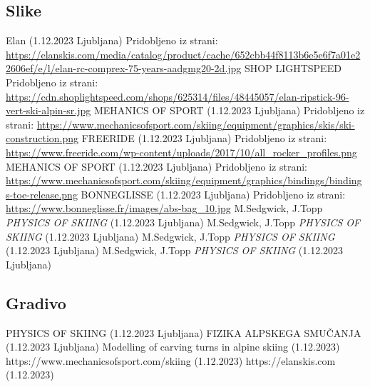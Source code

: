 \documentclass{article}
\begin{document}
\subsection{Slike}

\begin{thebibliography}{20}
      Elan (1.12.2023 Ljubljana) Pridobljeno iz strani: \url{https://elanskis.com/media/catalog/product/cache/652cbb44f8113b6e5e6f7a01e22606ef/e/l/elan-rc-comprex-75-years-aadgmg20-2d.jpg}
     SHOP LIGHTSPEED Pridobljeno iz strani: \url{https://cdn.shoplightspeed.com/shops/625314/files/48445057/elan-ripstick-96-vert-ski-alpin-sr.jpg}
     MEHANICS OF SPORT (1.12.2023 Ljubljana) Pridobljeno iz strani: \url{https://www.mechanicsofsport.com/skiing/equipment/graphics/skis/ski-construction.png}
     FREERIDE (1.12.2023 Ljubljana) Pridobljeno iz strani: \url{https://www.freeride.com/wp-content/uploads/2017/10/all_rocker_profiles.png} 
     MEHANICS OF SPORT (1.12.2023 Ljubljana) Pridobljeno iz strani: \url{https://www.mechanicsofsport.com/skiing/equipment/graphics/bindings/bindings-toe-release.png}
     BONNEGLISSE (1.12.2023 Ljubljana) Pridobljeno iz strani: \url{https://www.bonneglisse.fr/images/abs-bag_10.jpg}
     M.Sedgwick, J.Topp \emph{PHYSICS OF SKIING} (1.12.2023 Ljubljana)
     M.Sedgwick, J.Topp \emph{PHYSICS OF SKIING} (1.12.2023 Ljubljana)
     M.Sedgwick, J.Topp \emph{PHYSICS OF SKIING} (1.12.2023 Ljubljana)
     M.Sedgwick, J.Topp \emph{PHYSICS OF SKIING} (1.12.2023 Ljubljana)
\end{thebibliography}


\subsection{Gradivo}

\begin{thebibliography}{widestlabel} 
     PHYSICS OF SKIING (1.12.2023 Ljubljana)
    \bibitem[P.Fakin]{} FIZIKA ALPSKEGA SMUČANJA (1.12.2023 Ljubljana)
     Modelling of carving turns in alpine skiing (1.12.2023)
     https://www.mechanicsofsport.com/skiing (1.12.2023)
    \bibitem[ELAN]{}  https://elanskis.com (1.12.2023)
    
\end{thebibliography}
\end{document}

